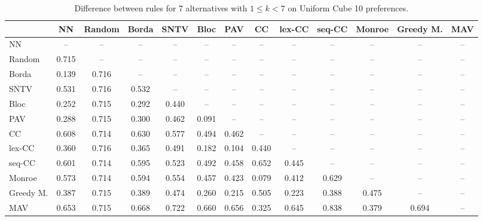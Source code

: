 
\begin{table*}[h!]
\centering
\begin{tabular}{lcccccccccccc}
\toprule
 & NN & Random & Borda & SNTV & Bloc & PAV & CC & lex-CC & seq-CC & Monroe & Greedy M. & MAV \\
\midrule
NN & -- & -- & -- & -- & -- & -- & -- & -- & -- & -- & -- & -- \\
Random & 0.715 & -- & -- & -- & -- & -- & -- & -- & -- & -- & -- & -- \\
Borda & 0.139 & 0.716 & -- & -- & -- & -- & -- & -- & -- & -- & -- & -- \\
SNTV & 0.531 & 0.716 & 0.532 & -- & -- & -- & -- & -- & -- & -- & -- & -- \\
Bloc & 0.252 & 0.715 & 0.292 & 0.440 & -- & -- & -- & -- & -- & -- & -- & -- \\
PAV & 0.288 & 0.715 & 0.300 & 0.462 & 0.091 & -- & -- & -- & -- & -- & -- & -- \\
CC & 0.608 & 0.714 & 0.630 & 0.577 & 0.494 & 0.462 & -- & -- & -- & -- & -- & -- \\
lex-CC & 0.360 & 0.716 & 0.365 & 0.491 & 0.182 & 0.104 & 0.440 & -- & -- & -- & -- & -- \\
seq-CC & 0.601 & 0.714 & 0.595 & 0.523 & 0.492 & 0.458 & 0.652 & 0.445 & -- & -- & -- & -- \\
Monroe & 0.573 & 0.714 & 0.594 & 0.554 & 0.457 & 0.423 & 0.079 & 0.412 & 0.629 & -- & -- & -- \\
Greedy M. & 0.387 & 0.715 & 0.389 & 0.474 & 0.260 & 0.215 & 0.505 & 0.223 & 0.388 & 0.475 & -- & -- \\
MAV & 0.653 & 0.715 & 0.668 & 0.722 & 0.660 & 0.656 & 0.325 & 0.645 & 0.838 & 0.379 & 0.694 & -- \\
\bottomrule
\end{tabular}

\caption{Difference between rules for 7 alternatives with $1 \leq k < 7$ on Uniform Cube 10 preferences.}
\end{table*}
